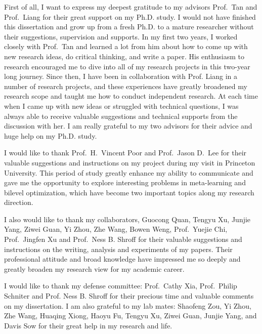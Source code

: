 \documentclass{osudissert96}
\begin{document}
\dedication{Dedicated to my parents, girlfriend and beloved.} 


\begin{acknowledgements}
First of all, I want to express my deepest gratitude to my advisors Prof.~Tan and Prof.~Liang for their great support on my Ph.D. study. I would not have finished this dissertation and grow up from a fresh Ph.D. to a mature researcher without their suggestions, supervision and supports. In my first two years, I worked closely with Prof.~Tan and learned a lot from him about how to come up with new research ideas, do critical thinking, and write a paper. His enthusiasm to research encouraged me to dive into all of my research projects in this two-year long journey. 
Since then, I have been in collaboration with Prof. Liang in a number of research projects, and these experiences have greatly broadened my research scope and taught me how to conduct independent research. At each time when I came up with new ideas or struggled with technical questions, I was always able to receive valuable suggestions and technical supports from the discussion with her. I am really grateful to my two advisors for their advice and huge help on my Ph.D. study. 


I would like to thank Prof.~H.~Vincent Poor and Prof.~Jason D.~Lee for their valuable suggestions and instructions 
on my project during my visit in Princeton University. This period of study greatly enhance my ability to communicate and gave me the opportunity to explore interesting problems in meta-learning and bilevel optimization, which have become two important topics  along my research direction.  



I also would like to thank my collaborators, Guocong Quan, Tengyu Xu, Junjie Yang, Ziwei Guan, Yi Zhou, Zhe Wang, Bowen Weng, Prof.~Yuejie Chi, Prof.~Jingfen Xu and Prof.~Ness B. Shroff for their  valuable suggestions and instructions on the writing, analysis and experiments of my papers. Their professional attitude and broad knowledge have impressed me so deeply and greatly broaden my research view for my academic career.



I would like to thank my defense committee: Prof.~Cathy Xia, Prof.~Philip Schniter and Prof. Ness B. Shroff   for their precious 
time and valuable comments on my dissertation. I am also grateful to my lab mates: Shaofeng Zou, Yi Zhou, Zhe Wang, Huaqing Xiong, Haoyu Fu, Tengyu Xu, Ziwei Guan, Junjie Yang, and Davis Sow for their great help in my research and life.


\end{acknowledgements}
\end{document}
